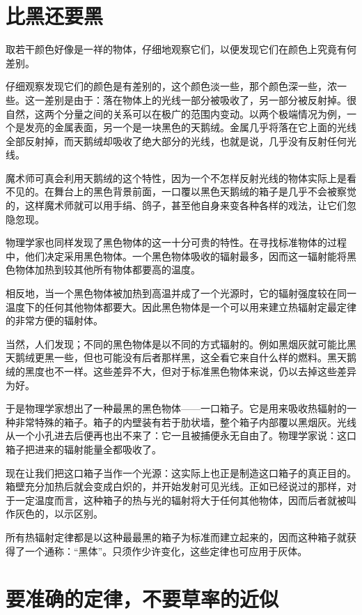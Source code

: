 \section{比黑还要黑}

取若干颜色好像是一祥的物体，仔细地观察它们，以便发现它们在颜色上究竟有何差别。

仔细观察发现它们的颜色是有差别的，这个颜色淡一些，那个颜色深一些，浓一些。这一差别是由于：落在物体上的光线一部分被吸收了，另一部分被反射掉。很自然，这两个分量之间的关系可以在极广的范围内变动。以两个极端情况为例，一个是发亮的金属表面，另一个是一块黑色的天鹅绒。金属几乎将落在它上面的光线全部反射掉，而天鹅绒却吸收了绝大部分的光线，也就是说，几乎没有反射任何光线。

魔术师可真会利用天鹅绒的这个特性，因为一个不怎样反射光线的物体实际上是看不见的。在舞台上的黑色背景前面，一口覆以黑色天鹅绒的箱子是几乎不会被察觉的，这样魔术师就可以用手绢、鸽子，甚至他自身来变各种各样的戏法，让它们忽隐忽现。

物理学家也同样发现了黑色物体的这一十分可贵的特性。在寻找标准物体的过程中，他们决定采用黑色物体。一个黑色物体吸收的辐射最多，因而这一辐射能将黑色物体加热到较其他所有物体都要高的温度。

相反地，当一个黑色物体被加热到高温并成了一个光源时，它的辐射强度较在同一温度下的任何其他物体都要大。因此黑色物体是一个可以用来建立热辐射定最定律的非常方便的辐射体。

当然，人们发现；不同的黑色物体是以不同的方式辐射的。例如黑烟灰就可能比黑天鹅绒更黑一些，但也可能没有后者那样黑，这全看它来自什么样的燃料。黑天鹅绒的黑度也不一样。这些差异不大，但对于标准黑色物体来说，仍以去掉这些差异为好。

于是物理学家想出了一种最黑的黑色物体——一口箱子。它是用来吸收热辐射的一种非常特殊的箱子。箱子的内壁装有若于肋状墙，整个箱子内部覆以黑烟灰。光线从一个小孔进去后便再也出不来了：它一且被捕便永无自由了。物理学家说：这口箱子把进来的辐射能量全都吸收了。

现在让我们把这口箱子当作一个光源：这实际上也正是制造这口箱子的真正目的。箱壁充分加热后就会变成白炽的，并开始发射可见光线。正如已经说过的那样，对于一定温度而言，这种箱子的热与光的辐射将大于任何其他物体，因而后者就被叫作灰色的，以示区别。

所有热辐射定律都是以这种最最黑的箱子为标准而建立起来的，因而这种箱子就获得了一个通称：“黑体”。只须作少许变化，这些定律也可应用于灰体。

\section{要准确的定律，不要草率的近似}

